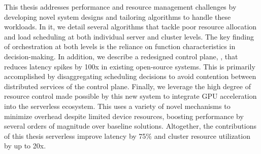 This thesis addresses performance and resource management challenges by developing novel system designs and tailoring algorithms to handle these workloads.
In it, we detail several algorithms that tackle poor resource allocation and load scheduling at both individual server and cluster levels.
The key finding of orchestration at both levels is the reliance on function characteristics in decision-making.
In addition, we describe a redesigned control plane, \sysname, that reduces latency spikes by 100x in existing open-source systems.
This is primarily accomplished by disaggregating scheduling decisions to avoid contention between distributed services of the control plane.
Finally, we leverage the high degree of resource control made possible by this new system to integrate GPU acceleration into the serverless ecosystem.
This uses a variety of novel mechanisms to minimize overhead despite limited device resources, boosting performance by several orders of magnitude over baseline solutions.
Altogether, the contributions of this thesis serverless improve latency by 75\% and cluster resource utilization by up to 20x.


